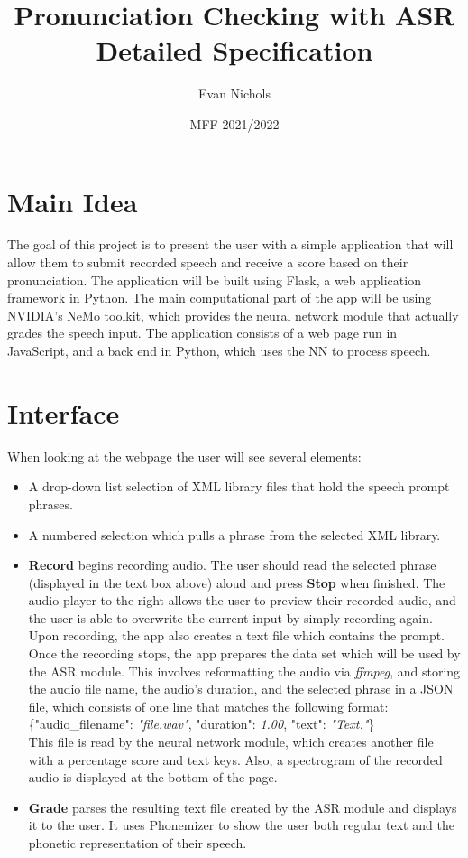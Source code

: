 \documentclass[12pt, letterpaper]{article}
\title{Pronunciation Checking with ASR\\ \small Detailed Specification}
\author{Evan Nichols}
\date{MFF 2021/2022}
\begin{document}
\maketitle

\section*{Main Idea}
The goal of this project is to present the user with a simple application that will allow them to submit recorded speech and receive a score based on their pronunciation. The application will be built using Flask, a web application framework in Python. The main computational part of the app will be using NVIDIA's NeMo toolkit, which provides the neural network module that actually grades the speech input. The application consists of a web page run in JavaScript, and a back end in Python, which uses the NN to process speech. 

\section*{Interface}
When looking at the webpage the user will see several elements:
\begin{itemize}
\item A drop-down list selection of XML library files that hold the speech prompt phrases.

\item A numbered selection which pulls a phrase from the selected XML library.

\item \textbf{Record} begins recording audio. The user should read the selected phrase (displayed in the text box above) aloud and press \textbf{Stop} when finished. The audio player to the right allows the user to preview their recorded audio, and the user is able to overwrite the current input by simply recording again. Upon recording, the app also creates a text file which contains the prompt. Once the recording stops, the app prepares the data set which will be used by the ASR module. This involves reformatting the audio via \textit{ffmpeg}, and storing the audio file name, the audio's duration, and the selected phrase in a JSON file, which consists of one line that matches the following format: \\
\hspace*{19mm} \{"audio\_filename": \textit{"file.wav"}, "duration": \textit{1.00}, "text": \textit{"Text."}\} \\
This file is read by the neural network module, which creates another file with a percentage score and text keys. Also, a spectrogram of the recorded audio is displayed at the bottom of the page.

\item \textbf{Grade} parses the resulting text file created by the ASR module and displays it to the user. It uses Phonemizer to show the user both regular text and the phonetic representation of their speech.
\end{itemize}
\newpage%
\end{document}
